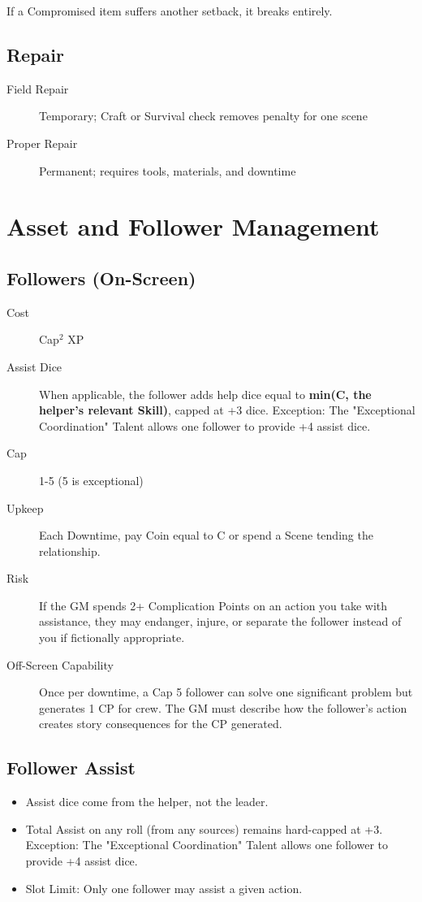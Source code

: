 If a Compromised item suffers another setback, it breaks entirely.

\subsection{Repair}

\begin{description}
\item[Field Repair] Temporary; Craft or Survival check removes penalty for one scene
\item[Proper Repair] Permanent; requires tools, materials, and downtime
\end{description}

\section{Asset and Follower Management}

\subsection{Followers (On-Screen)}

\begin{description}
\item[Cost] Cap$^2$ XP
\item[Assist Dice] When applicable, the follower adds help dice equal to \textbf{min(C, the helper's relevant Skill)}, capped at +3 dice. Exception: The "Exceptional Coordination" Talent allows one follower to provide +4 assist dice.
\item[Cap] 1-5 (5 is exceptional)
\item[Upkeep] Each Downtime, pay Coin equal to C or spend a Scene tending the relationship.
\item[Risk] If the GM spends 2+ Complication Points on an action you take with assistance, they may endanger, injure, or separate the follower instead of you if fictionally appropriate.
\item[Off-Screen Capability] Once per downtime, a Cap 5 follower can solve one significant problem but generates 1 CP for crew. The GM must describe how the follower's action creates story consequences for the CP generated.
\end{description}

\subsection{Follower Assist}
\begin{itemize}
    \item Assist dice come from the helper, not the leader.
    \item Total Assist on any roll (from any sources) remains hard-capped at +3. Exception: The "Exceptional Coordination" Talent allows one follower to provide +4 assist dice.
    \item Slot Limit: Only one follower may assist a given action.
\end{itemize}

